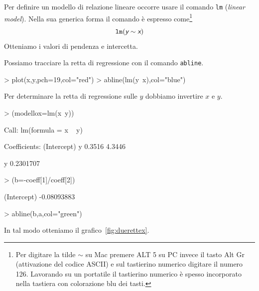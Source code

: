 \documentclass[onecolumn,12pt]{book}
\newcommand{\varia}[1]{\textsl{\textsf{#1}}}
\newcommand{\mytilde}{$\sim$}
\begin{document}
Per definire un modello di relazione lineare occorre usare il comando \texttt{lm} (\varia{linear model}).
Nella sua generica forma il comando \`e espresso come\footnote{ Per digitare la tilde  \mytilde\;  su Mac premere ALT 5 su PC invece il tasto Alt Gr (attivazione del codice ASCII) e sul tastierino numerico digitare il numero 126. Lavorando su un portatile il tastierino numerico \`e spesso incorporato nella tastiera con colorazione blu dei tasti.}
$$\texttt{lm}(\varia{y} \sim  \varia{x})$$
Otteniamo i valori di pendenza e intercetta.

Possiamo tracciare la retta di regressione con il comando \texttt{abline}.
\begin{Schunk}
\begin{Sinput}
> plot(x,y,pch=19,col="red")
> abline(lm(y~x),col="blue")
\end{Sinput}
\end{Schunk}
Per determinare  la retta di regressione sulle $y$ dobbiamo invertire $x$ e $y$.
\begin{Schunk}
\begin{Sinput}
> (modellox=lm(x~y))
\end{Sinput}
\begin{Soutput}
Call:
lm(formula = x ~ y)

Coefficients:
(Intercept)            y  
     0.3516       4.3446  
\end{Soutput}
\begin{Soutput}
        y 
0.2301707 
\end{Soutput}
\begin{Sinput}
> (b=-coeff[1]/coeff[2])
\end{Sinput}
\begin{Soutput}
(Intercept) 
-0.08093883 
\end{Soutput}
\begin{Sinput}
> abline(b,a,col="green")
\end{Sinput}
\end{Schunk}
In tal modo otteniamo il grafico~\ref{fig:duerettex}.
\end{document}
